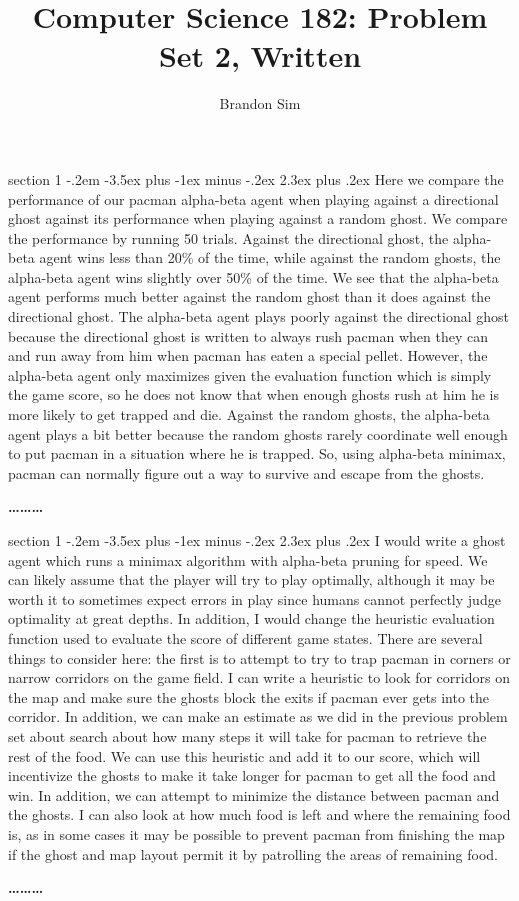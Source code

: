 \documentclass[12pt]{article}
\makeatletter
\newenvironment{problem}{\@startsection
       {section}
       {1}
       {-.2em}
       {-3.5ex plus -1ex minus -.2ex}
       {2.3ex plus .2ex}
       {\pagebreak[3] %
       \large\bf\noindent{Problem }
       }
       }
       {%
       \begin{center}\large\bf \ldots\ldots\ldots\end{center}}
\makeatother
\begin{document}
\title{Computer Science 182: Problem Set 2, Written}
\author{Brandon Sim}

\maketitle

\begin{problem}{}
Here we compare the performance of our pacman alpha-beta agent when playing against a directional ghost against its performance when playing against a random ghost. We compare the performance by running 50 trials. Against the directional ghost, the alpha-beta agent wins less than 20\% of the time, while against the random ghosts, the alpha-beta agent wins slightly over 50\% of the time. We see that the alpha-beta agent performs much better against the random ghost than it does against the directional ghost. The alpha-beta agent plays poorly against the directional ghost because the directional ghost is written to always rush pacman when they can and run away from him when pacman has eaten a special pellet. However, the alpha-beta agent only maximizes given the evaluation function which is simply the game score, so he does not know that when enough ghosts rush at him he is more likely to get trapped and die. Against the random ghosts, the alpha-beta agent plays a bit better because the random ghosts rarely coordinate well enough to put pacman in a situation where he is trapped. So, using alpha-beta minimax, pacman can normally figure out a way to survive and escape from the ghosts.
\end{problem}

\begin{problem}{}
I would write a ghost agent which runs a minimax algorithm with alpha-beta pruning for speed. We can likely assume that the player will try to play optimally, although it may be worth it to sometimes expect errors in play since humans cannot perfectly judge optimality at great depths. In addition, I would change the heuristic evaluation function used to evaluate the score of different game states. There are several things to consider here: the first is to attempt to try to trap pacman in corners or narrow corridors on the game field. I can write a heuristic to look for corridors on the map and make sure the ghosts block the exits if pacman ever gets into the corridor. In addition, we can make an estimate as we did in the previous problem set about search about how many steps it will take for pacman to retrieve the rest of the food. We can use this heuristic and add it to our score, which will incentivize the ghosts to make it take longer for pacman to get all the food and win. In addition, we can attempt to minimize the distance between pacman and the ghosts. I can also look at how much food is left and where the remaining food is, as in some cases it may be possible to prevent pacman from finishing the map if the ghost and map layout permit it by patrolling the areas of remaining food.
\end{problem}
\end{document}
